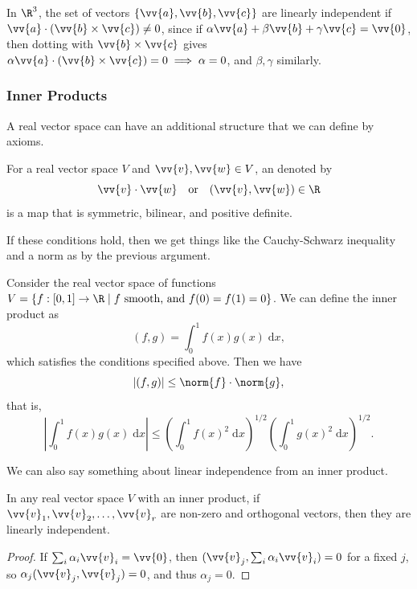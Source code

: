 In $\R^3$, the set of vectors $\{\vv{a}, \vv{b}, \vv{c}\}$ are linearly independent if $\vv{a} \cdot (\vv{b} \times \vv{c}) \neq 0$, since if $\alpha \vv{a} + \beta \vv{b} + \gamma \vv{c} = \vv{0}$, then dotting with $\vv{b} \times \vv{c}$ gives $\alpha \vv{a} \cdot (\vv{b} \times \vv{c}) = 0 \implies \alpha = 0$, and $\beta, \gamma$ similarly.


\subsubsection{Inner Products}

A real vector space can have an additional structure that we can define by axioms.

\begin{definition}
    For a real vector space $V$ and $\vv{v}, \vv{w} \in V$, an  denoted by
    $$
    \vv{v} \cdot \vv{w} \quad \text{or} \quad (\vv{v}, \vv{w}) \in \R
    $$
    is a map that is symmetric, bilinear, and positive definite.
\end{definition}

If these conditions hold, then we get things like the Cauchy-Schwarz inequality and a norm as by the previous argument.

\begin{example}
    Consider the real vector space of functions $V = \{ f: [0, 1] \rightarrow \R \mid f \text{ smooth, and } f(0) = f(1) = 0 \}$.
    We can define the inner product as
    $$
    (f, g) = \int_0^1 f(x)g(x) \; \mathrm{d}x,
    $$
    which satisfies the conditions specified above. Then we have
    $$
    |(f, g)| \leq \norm{f} \cdot \norm{g},
    $$
    that is,
    $$
    \left| \int_0^1 f(x)g(x)\; \mathrm{d}x \right| \leq \left(\int_0^1 f(x)^2\; \mathrm{d}x\right)^{1/2} \left(\int_0^1 g(x)^2\; \mathrm{d}x\right)^{1/2}.
    $$
\end{example}

We can also say something about linear independence from an inner product.

\begin{lemma}
In any real vector space $V$ with an inner product, if $\vv{v}_1, \vv{v}_2, \dots, \vv{v}_r$ are non-zero and orthogonal vectors, then they are linearly independent.
\end{lemma}
\begin{proof}
    If $\sum_i \alpha_i \vv{v}_i = \vv{0}$, then $(\vv{v}_j, \sum_i \alpha_i \vv{v}_i) = 0$ for a fixed $j$, so $\alpha_j (\vv{v}_j, \vv{v}_j) = 0$, and thus $\alpha_j = 0$.
\end{proof}

